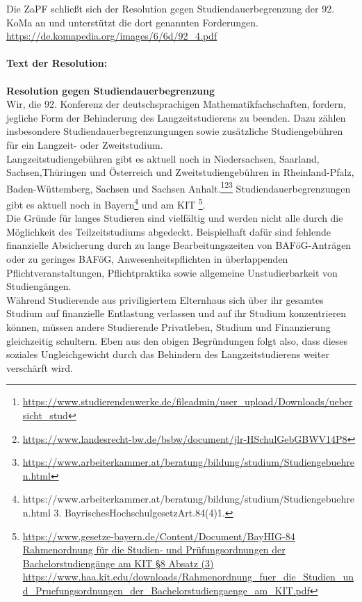 \documentclass[DIV=calc]{scrartcl}
\begin{document}
Die ZaPF schließt sich der Resolution gegen Studiendauerbegrenzung der 92. KoMa an und unterstützt die dort genannten Forderungen. \url{https://de.komapedia.org/images/6/6d/92_4.pdf} \\ \\
\textbf{Text der Resolution:}\\\\
\textbf{Resolution gegen Studiendauerbegrenzung}\\
Wir, die 92. Konferenz der deutschsprachigen Mathematikfachschaften, fordern, jegliche Form der Behinderung des Langzeitstudierens zu beenden. Dazu zählen insbesondere Studiendauerbegrenzungungen sowie zusätzliche Studiengebühren für ein Langzeit- oder Zweitstudium.\\ Langzeitstudiengebühren gibt es aktuell noch in Niedersachsen, Saarland, Sachsen,Thüringen und Österreich und Zweitstudiengebühren in Rheinland-Pfalz, Baden-Wüttemberg, Sachsen und
Sachsen Anhalt.\footnote{\url{https://www.studierendenwerke.de/fileadmin/user_upload/Downloads/uebersicht_stud}}\footnote{\url{https://www.landesrecht-bw.de/bsbw/document/jlr-HSchulGebGBWV14P8}}\footnote{\url{https://www.arbeiterkammer.at/beratung/bildung/studium/Studiengebuehren.html}} Studiendauerbegrenzungen gibt es aktuell noch in Bayern\footnote{https://www.arbeiterkammer.at/beratung/bildung/studium/Studiengebuehren.html 3. 
BayrischesHochschulgesetzArt.84(4)1.} und am KIT \footnote{\url{https://www.gesetze-bayern.de/Content/Document/BayHIG-84 Rahmenordnung für die Studien- und Prüfungsordnungen der Bachelorstudiengänge am KIT §8 Absatz (3) https://www.haa.kit.edu/downloads/Rahmenordnung_fuer_die_Studien_und_Pruefungsordnungen_der_Bachelorstudiengaenge_am_KIT.pdf}}.\\
Die Gründe für langes Studieren sind vielfältig und werden nicht alle durch die Möglichkeit des Teilzeitstudiums abgedeckt. Beispielhaft dafür sind fehlende finanzielle Absicherung durch zu lange Bearbeitungszeiten von BAFöG-Anträgen oder zu geringes BAFöG, Anwesenheitspflichten in überlappenden Pflichtveranstaltungen, Pflichtpraktika sowie allgemeine Unstudierbarkeit von Studiengängen.\\
Während Studierende aus priviligiertem Elternhaus sich über ihr gesamtes Studium auf finanzielle Entlastung verlassen und auf ihr Studium konzentrieren können, müssen andere Studierende Privatleben, Studium und Finanzierung gleichzeitig schultern. Eben aus den obigen Begründungen folgt also, dass dieses soziales Ungleichgewicht durch das Behindern des Langzeitstudierens weiter verschärft wird.\\
\end{document}
